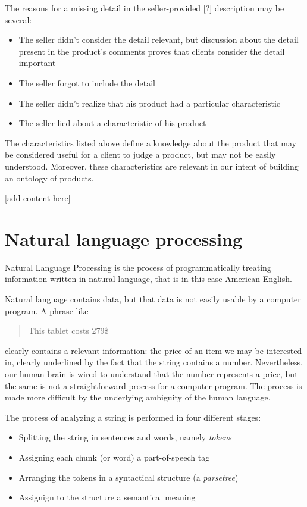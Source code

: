 \documentclass[LaM,binding=0.6cm]{sapthesis}
\begin{document}
The reasons for a missing detail in the seller-provided [?] description may be several:
\begin{itemize}
	\item The seller didn't consider the detail relevant, but discussion about the detail present in the product's comments proves that clients consider the detail important
	\item The seller forgot to include the detail
	\item The seller didn't realize that his product had a particular characteristic
	\item The seller lied about a characteristic of his product
\end{itemize}

The characteristics listed above define a knowledge about the product that may be considered useful for a client to judge a product, but may not be easily understood. Moreover, these characteristics are relevant in our intent of building an ontology of products.

[add content here]

\section{Natural language processing}

Natural Language Processing is the process of programmatically treating information written in natural language, that is in this case American English. 

Natural language contains data, but that data is not easily usable by a computer program. A phrase like

\begin{quote}
This tablet costs 279\$
\end{quote}

clearly contains a relevant information: the price of an item we may be interested in, clearly underlined by the fact that the string contains a number. Nevertheless, our human brain is wired to understand that the number represents a price, but the same is not a straightforward process for a computer program. The process is made more difficult by the underlying ambiguity of the human language. 

The process of analyzing a string is performed in four different stages:
\begin{itemize}
	\item Splitting the string in sentences and words, namely \textit{tokens}
	\item Assigning each chunk (or word) a part-of-speech tag
	\item Arranging the tokens in a syntactical structure (a \textit{parsetree})
	\item Assignign to the structure a semantical meaning
\end{itemize}
\end{document}
